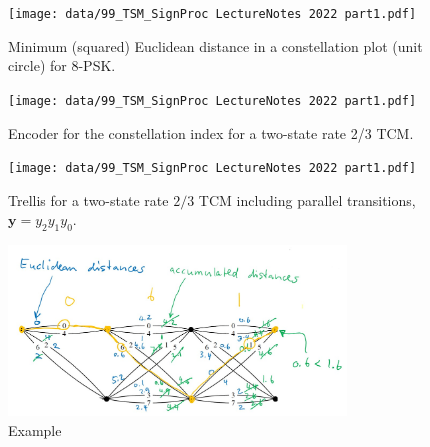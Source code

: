 \begin{figure}[ht]
    \centering
        \texttt{[image: data/99\_TSM\_SignProc LectureNotes 2022 part1.pdf]}
    \caption{Minimum (squared) Euclidean distance in a constellation plot (unit circle) for 8-PSK.}
    \label{fig:pdf1}
\end{figure}
\begin{figure}[ht]
    \centering
        \texttt{[image: data/99\_TSM\_SignProc LectureNotes 2022 part1.pdf]}
    \caption{Encoder for the constellation index for a two-state rate 2/3 TCM.}
    \label{fig:pdf2}
\end{figure}
\begin{figure}[ht]
    \centering
        \texttt{[image: data/99\_TSM\_SignProc LectureNotes 2022 part1.pdf]}
    \caption{Trellis for a two-state rate $2 / 3$ TCM including parallel transitions, $\boldsymbol{y}=y_2 y_1 y_0$.}
    \label{fig:pdf3}
\end{figure}
\begin{figure}[ht]
    \centering
        \includegraphics[width=0.8\textwidth]{images/trellis_example.jpg}
    \caption{Example}
    \label{fig:example_trellis}
\end{figure}

